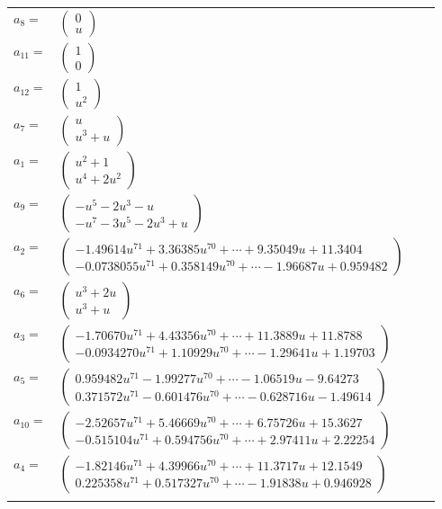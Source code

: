 \documentclass[1p]{elsarticle_modified}
\theoremstyle{definition}
\begin{document}
\begin{tabular}{m{7pt} m{180pt} m{7pt} m{180pt} }
\flushright $a_{8}=$&$\begin{pmatrix}0\\u\end{pmatrix}$ \\
\flushright $a_{11}=$&$\begin{pmatrix}1\\0\end{pmatrix}$ \\
\flushright $a_{12}=$&$\begin{pmatrix}1\\u^2\end{pmatrix}$ \\
\flushright $a_{7}=$&$\begin{pmatrix}u\\u^3+u\end{pmatrix}$ \\
\flushright $a_{1}=$&$\begin{pmatrix}u^2+1\\u^4+2 u^2\end{pmatrix}$ \\
\flushright $a_{9}=$&$\begin{pmatrix}- u^5-2 u^3- u\\- u^7-3 u^5-2 u^3+u\end{pmatrix}$ \\
\flushright $a_{2}=$&$\begin{pmatrix}-1.49614 u^{71}+3.36385 u^{70}+\cdots+9.35049 u+11.3404\\-0.0738055 u^{71}+0.358149 u^{70}+\cdots-1.96687 u+0.959482\end{pmatrix}$ \\
\flushright $a_{6}=$&$\begin{pmatrix}u^3+2 u\\u^3+u\end{pmatrix}$ \\
\flushright $a_{3}=$&$\begin{pmatrix}-1.70670 u^{71}+4.43356 u^{70}+\cdots+11.3889 u+11.8788\\-0.0934270 u^{71}+1.10929 u^{70}+\cdots-1.29641 u+1.19703\end{pmatrix}$ \\
\flushright $a_{5}=$&$\begin{pmatrix}0.959482 u^{71}-1.99277 u^{70}+\cdots-1.06519 u-9.64273\\0.371572 u^{71}-0.601476 u^{70}+\cdots-0.628716 u-1.49614\end{pmatrix}$ \\
\flushright $a_{10}=$&$\begin{pmatrix}-2.52657 u^{71}+5.46669 u^{70}+\cdots+6.75726 u+15.3627\\-0.515104 u^{71}+0.594756 u^{70}+\cdots+2.97411 u+2.22254\end{pmatrix}$ \\
\flushright $a_{4}=$&$\begin{pmatrix}-1.82146 u^{71}+4.39966 u^{70}+\cdots+11.3717 u+12.1549\\0.225358 u^{71}+0.517327 u^{70}+\cdots-1.91838 u+0.946928\end{pmatrix}$\\&\end{tabular}
\end{document}
